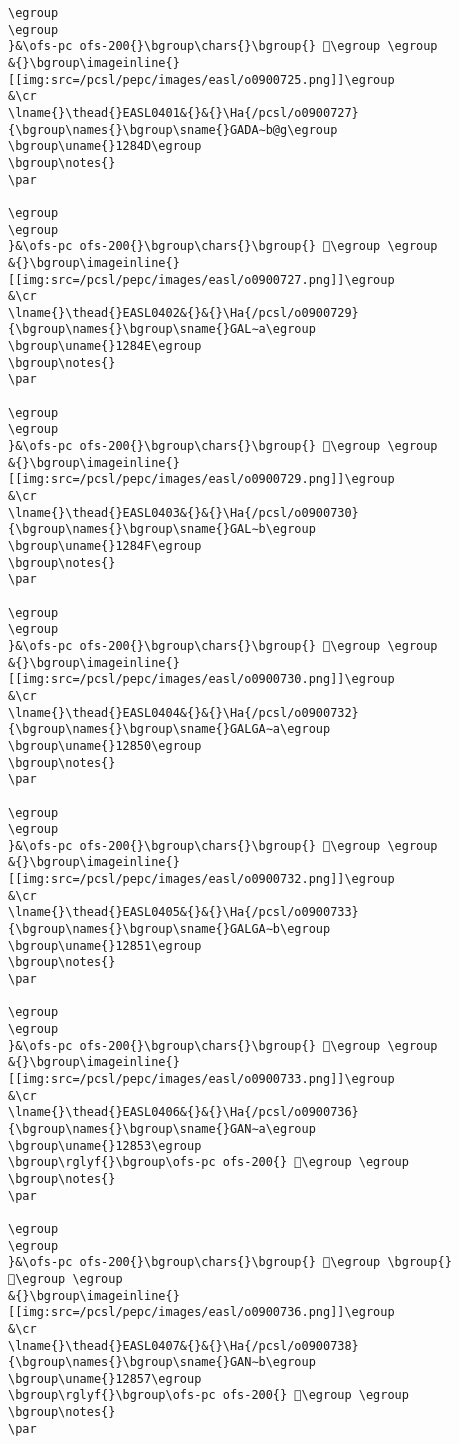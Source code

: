 \begin{verbatim}
\egroup
\egroup
}&\ofs-pc ofs-200{}\bgroup\chars{}\bgroup{} 𒡌\egroup \egroup
&{}\bgroup\imageinline{}[[img:src=/pcsl/pepc/images/easl/o0900725.png]]\egroup
&\cr
\lname{}\thead{}EASL0401&{}&{}\Ha{/pcsl/o0900727}{\bgroup\names{}\bgroup\sname{}GADA∼b@g\egroup
\bgroup\uname{}1284D\egroup
\bgroup\notes{}
\par 

\egroup
\egroup
}&\ofs-pc ofs-200{}\bgroup\chars{}\bgroup{} 𒡍\egroup \egroup
&{}\bgroup\imageinline{}[[img:src=/pcsl/pepc/images/easl/o0900727.png]]\egroup
&\cr
\lname{}\thead{}EASL0402&{}&{}\Ha{/pcsl/o0900729}{\bgroup\names{}\bgroup\sname{}GAL∼a\egroup
\bgroup\uname{}1284E\egroup
\bgroup\notes{}
\par 

\egroup
\egroup
}&\ofs-pc ofs-200{}\bgroup\chars{}\bgroup{} 𒡎\egroup \egroup
&{}\bgroup\imageinline{}[[img:src=/pcsl/pepc/images/easl/o0900729.png]]\egroup
&\cr
\lname{}\thead{}EASL0403&{}&{}\Ha{/pcsl/o0900730}{\bgroup\names{}\bgroup\sname{}GAL∼b\egroup
\bgroup\uname{}1284F\egroup
\bgroup\notes{}
\par 

\egroup
\egroup
}&\ofs-pc ofs-200{}\bgroup\chars{}\bgroup{} 𒡏\egroup \egroup
&{}\bgroup\imageinline{}[[img:src=/pcsl/pepc/images/easl/o0900730.png]]\egroup
&\cr
\lname{}\thead{}EASL0404&{}&{}\Ha{/pcsl/o0900732}{\bgroup\names{}\bgroup\sname{}GALGA∼a\egroup
\bgroup\uname{}12850\egroup
\bgroup\notes{}
\par 

\egroup
\egroup
}&\ofs-pc ofs-200{}\bgroup\chars{}\bgroup{} 𒡐\egroup \egroup
&{}\bgroup\imageinline{}[[img:src=/pcsl/pepc/images/easl/o0900732.png]]\egroup
&\cr
\lname{}\thead{}EASL0405&{}&{}\Ha{/pcsl/o0900733}{\bgroup\names{}\bgroup\sname{}GALGA∼b\egroup
\bgroup\uname{}12851\egroup
\bgroup\notes{}
\par 

\egroup
\egroup
}&\ofs-pc ofs-200{}\bgroup\chars{}\bgroup{} 𒡑\egroup \egroup
&{}\bgroup\imageinline{}[[img:src=/pcsl/pepc/images/easl/o0900733.png]]\egroup
&\cr
\lname{}\thead{}EASL0406&{}&{}\Ha{/pcsl/o0900736}{\bgroup\names{}\bgroup\sname{}GAN∼a\egroup
\bgroup\uname{}12853\egroup
\bgroup\rglyf{}\bgroup\ofs-pc ofs-200{} 𒡓\egroup \egroup
\bgroup\notes{}
\par 

\egroup
\egroup
}&\ofs-pc ofs-200{}\bgroup\chars{}\bgroup{} 𒡒\egroup \bgroup{} 𒡓\egroup \egroup
&{}\bgroup\imageinline{}[[img:src=/pcsl/pepc/images/easl/o0900736.png]]\egroup
&\cr
\lname{}\thead{}EASL0407&{}&{}\Ha{/pcsl/o0900738}{\bgroup\names{}\bgroup\sname{}GAN∼b\egroup
\bgroup\uname{}12857\egroup
\bgroup\rglyf{}\bgroup\ofs-pc ofs-200{} 𒡗\egroup \egroup
\bgroup\notes{}
\par 


\end{verbatim}
